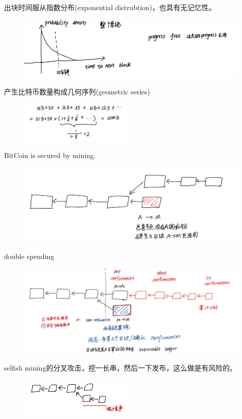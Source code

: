 \documentclass[10pt]{ctexart}
\begin{document}
出块时间服从指数分布(exponential distrubtion)，也具有无记忆性。
\begin{figure}[H]
    \centering
    \includegraphics[width=1\textwidth]{courses/区块链技术与应用/lecture5/img3.png} 
\end{figure}
产生比特币数量构成几何序列(geometric series)
\begin{figure}[H]
    \centering
    \includegraphics[width=0.5\textwidth]{courses/区块链技术与应用/lecture5/img4.png} 
\end{figure}
BitCoin is secured by mining.
\begin{figure}[H]
    \centering
    \includegraphics[width=1\textwidth]{courses/区块链技术与应用/lecture5/img5.png} 
\end{figure}
double spending
\begin{figure}[H]
    \centering
    \includegraphics[width=1\textwidth]{courses/区块链技术与应用/lecture5/img6.png} 
\end{figure}
selfish mining的分叉攻击，挖一长串，然后一下发布，这么做是有风险的。
\begin{figure}[H]
    \centering
    \includegraphics[width=0.5\textwidth]{courses/区块链技术与应用/lecture5/img7.png} 
\end{figure}
\end{document}
